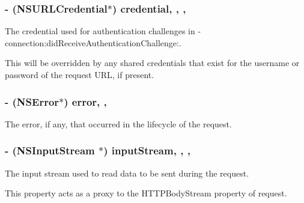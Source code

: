 \subsubsection[{credential}]{\setlength{\rightskip}{0pt plus 5cm}-\/ (N\+S\+U\+R\+L\+Credential$\ast$) credential\hspace{0.3cm}{\ttfamily [read]}, {\ttfamily [write]}, {\ttfamily [nonatomic]}, {\ttfamily [strong]}}\label{interface_a_f_u_r_l_connection_operation_a3117677d8c96460f0bd1b4d3b13b6da8}
The credential used for authentication challenges in {\ttfamily -\/connection\+:did\+Receive\+Authentication\+Challenge\+:}.

This will be overridden by any shared credentials that exist for the username or password of the request U\+R\+L, if present. \hypertarget{interface_a_f_u_r_l_connection_operation_a68b600bc05847243902758f5565353ed}{}
\subsubsection[{error}]{\setlength{\rightskip}{0pt plus 5cm}-\/ (N\+S\+Error$\ast$) error\hspace{0.3cm}{\ttfamily [read]}, {\ttfamily [nonatomic]}, {\ttfamily [strong]}}\label{interface_a_f_u_r_l_connection_operation_a68b600bc05847243902758f5565353ed}
The error, if any, that occurred in the lifecycle of the request. \hypertarget{interface_a_f_u_r_l_connection_operation_a2a8f5ad38fa0f464f0104f9e46cf4043}{}
\subsubsection[{input\+Stream}]{\setlength{\rightskip}{0pt plus 5cm}-\/ (N\+S\+Input\+Stream $\ast$) input\+Stream\hspace{0.3cm}{\ttfamily [read]}, {\ttfamily [write]}, {\ttfamily [nonatomic]}, {\ttfamily [strong]}}\label{interface_a_f_u_r_l_connection_operation_a2a8f5ad38fa0f464f0104f9e46cf4043}
The input stream used to read data to be sent during the request.

This property acts as a proxy to the {\ttfamily H\+T\+T\+P\+Body\+Stream} property of {\ttfamily request}. \hypertarget{interface_a_f_u_r_l_connection_operation_a6778c4ebc8739292f8aa0ebdffba0749}{}
